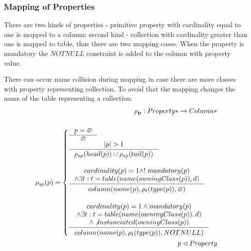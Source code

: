 \documentclass[11pt]{article}
\begin{document}
\subsubsection{Mapping of Properties}
There are two kinds of properties - primitive property with cardinality equal to one is mapped to a column; second kind - collection with cardinality greater than one is mapped to table, thus there are two mapping cases. When the property is mandatory the $NOTNULL$ constraint is added to the column with property value. 

There can occur name collision during mapping in case there are more classes with property representing collection. To avoid that the mapping changes the name of the table representing a collection.
\begin{align*}
	\mathbf{\rho_p} : Property* \rightarrow Column* \\ \\
	\rho_{sp}(p) = \begin{cases}
		\inference{p = \varnothing}{\varnothing}\\
		\inference{|p| > 1}{\rho_{sp}(head(p)) \cup \rho_{sp}(tail(p))}\\\\
 		\inference{cardinality(p) = 1 \wedge !\;mandatory(p)
 			\\ \wedge \exists t : t = table(name(owningClass(p)), d) 
		 }{\begin{gathered}
	  		column(name(p), \rho_t(type(p)), \varnothing )
		\end{gathered}} \\ \\
  		\inference{cardinality(p) = 1 \wedge mandatory(p)
			 \\ \wedge \exists t : t = table(name(owningClass(p)), d)
			\\ \wedge \not instanciated(owningClass(p))
		}{\begin{gathered}
 	 		column(name(p), \rho_t(type(p)), NOTNULL ) \\ 
		\end{gathered}}
	\end{cases}\\
	p \lhd Property
\end{align*}
\end{document}

